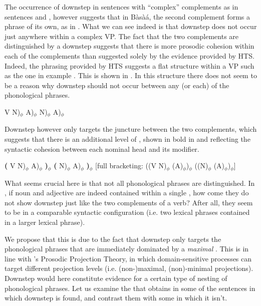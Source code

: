\documentclass[output=paper,newtxmath,modfonts,nonflat,hidelinks]{langsci/langscibook}
\begin{document}
The occurrence of downstep in sentences with ``complex'' complements as in sentences  and , however suggests that in Bàsà{á}, the second complement forms a phrase of its own, as in . What we can see indeed is that downstep does not occur just anywhere within a complex VP. The fact that the two complements are distinguished by a downstep suggests that there is more prosodic cohesion within each of the complements than suggested solely by the evidence provided by HTS. Indeed, the phrasing provided by HTS suggests a flat structure within a VP such as the one in example . This is shown in . In this structure there does not seem to be a reason why downstep should not occur between any (or each) of the phonological phrases.


\ea V N)$_{\phi}$ A)$_{\phi}$ N)$_{\phi}$ A)$_{\phi}$ \label{ex:HamlaouiMakasso:25}
\z

Downstep however only targets the juncture between the two complements, which suggests that there is an additional level of , shown in bold in  and reflecting the syntactic cohesion between each nominal head and its modifier.


\ea \textbf{(} V N)$_{\phi}$ A)$_{\phi}$ \textbf{)$_{\phi}$} \textbf{(} N)$_{\phi}$ A)$_{\phi}$ \textbf{)$_{\phi}$} [full bracketing:  ((V N)$_{\phi}$ (A)$_{\phi}$)$_{\phi}$ ((N)$_{\phi}$ (A)$_{\phi}$)$_{\phi}$]\label{ex:HamlaouiMakasso:26}
\z

What seems crucial here is that not all phonological phrases are distinguished. In , if noun and adjective are indeed contained within a single , how come they do not show downstep just like the two complements of a verb? After all, they seem to be in a  comparable syntactic configuration (i.e. two lexical phrases contained in a larger lexical phrase).

We propose that this is due to the fact that downstep only targets the phonological phrases that are immediately dominated by a \emph{maximal} . This is in line with \citeauthor{ItoMester12}'s \citeyearpar{ItoMester12, ItoMester13} Prosodic Projection Theory, in which domain-sensitive processes can target different projection levels (i.e. (non-)maximal, (non)-minimal projections). Downstep would here constitute e\-vi\-dence for a certain type of nesting of phonological phrases.
Let us examine the  that obtains in some of the sentences in which downstep is found, and contrast them with some in which it isn't.  
\end{document}
